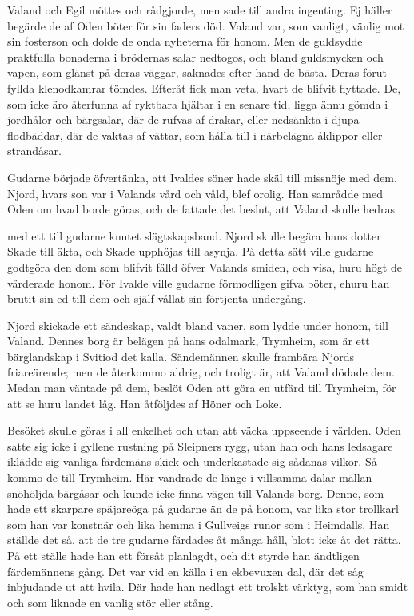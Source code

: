 Valand och Egil möttes och rådgjorde, men sade till andra ingenting. Ej
häller begärde de af Oden böter för sin faders död. Valand var, som
vanligt, vänlig mot sin fosterson och dolde de onda nyheterna för honom.
Men de guldsydde praktfulla bonaderna i brödernas salar nedtogos, och
bland guldsmycken och vapen, som glänst på deras väggar, saknades efter
hand de bästa. Deras förut fyllda klenodkamrar tömdes. Efteråt fick man
veta, hvart de blifvit flyttade. De, som icke äro återfunna af ryktbara
hjältar i en senare tid, ligga ännu gömda i jordhålor och bärgsalar, där
de rufvas af drakar, eller nedsänkta i djupa flodbäddar, där de vaktas
af vättar, som hålla till i närbelägna åklippor eller strandåsar.

Gudarne började öfvertänka, att Ivaldes söner hade skäl till missnöje
med dem. Njord, hvars son var i Valands vård och våld, blef orolig. Han
samrådde med Oden om hvad borde göras, och de fattade det beslut, att
Valand skulle hedras

med ett till gudarne knutet slägtskapsband. Njord skulle begära hans
dotter Skade till äkta, och Skade upphöjas till asynja. På detta sätt
ville gudarne godtgöra den dom som blifvit fälld öfver Valands smiden,
och visa, huru högt de värderade honom. För Ivalde ville gudarne
förmodligen gifva böter, ehuru han brutit sin ed till dem och själf
vållat sin förtjenta undergång.

Njord skickade ett sändeskap, valdt bland vaner, som lydde under honom,
till Valand. Dennes borg är belägen på hans odalmark, Trymheim, som är
ett bärglandskap i Svitiod det kalla. Sändemännen skulle frambära Njords
friareärende; men de återkommo aldrig, och troligt är, att Valand dödade
dem. Medan man väntade på dem, beslöt Oden att göra en utfärd till
Trymheim, för att se huru landet låg. Han åtföljdes af Höner och Loke.

Besöket skulle göras i all enkelhet och utan att väcka uppseende i
världen. Oden satte sig icke i gyllene rustning på Sleipners rygg, utan
han och hans ledsagare iklädde sig vanliga färdemäns skick och
underkastade sig sådanas vilkor. Så kommo de till Trymheim. Här vandrade
de länge i villsamma dalar mällan snöhöljda bärgåsar och kunde icke
finna vägen till Valands borg. Denne, som hade ett skarpare späjareöga
på gudarne än de på honom, var lika stor trollkarl som han var konstnär
och lika hemma i Gullveigs runor som i Heimdalls. Han ställde det så,
att de tre gudarne färdades åt många håll, blott icke åt det rätta. På
ett ställe hade han ett försåt planlagdt, och dit styrde han ändtligen
färdemännens gång. Det var vid en källa i en ekbevuxen dal, där det såg
inbjudande ut att hvila. Där hade han nedlagt ett trolskt värktyg, som
han smidt och som liknade en vanlig stör eller stång.

